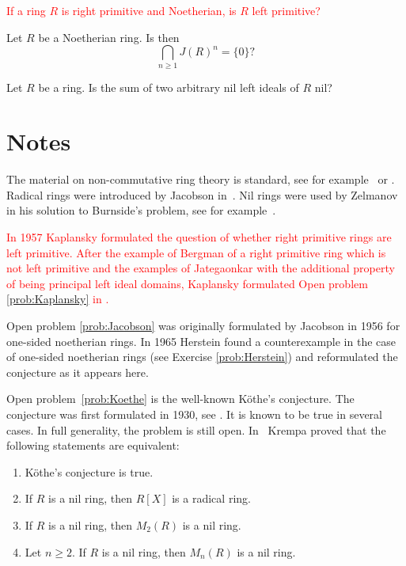 
\begin{problem}[Kaplansky]
\label{prob:Kaplansky}
\textcolor{red}{If a ring $R$ is right primitive and Noetherian, is $R$ left primitive?}
\end{problem}

\begin{problem}[Jacobson]
\label{prob:Jacobson}
Let $R$ be a Noetherian ring. Is then 
\[
\bigcap_{n\geq1}J(R)^n=\{0\}?
\]
\end{problem}

\begin{problem}[K\"othe]
	\label{prob:Koethe}
	Let $R$ be a ring. Is the sum 
	of two arbitrary nil left ideals of $R$  nil?
\end{problem}


\section{Notes}

The material on non-commutative ring theory is standard, see for example~\cite{MR3308118} or \cite{MR0530404}.
Radical rings were introduced by Jacobson in~\cite{MR12271}. Nil rings were
used by Zelmanov in his solution to Burnside's problem, see for example~\cite{MR1199575}.

\textcolor{red}{In 1957 \cite{MR0096696} Kaplansky formulated the question of whether right primitive rings are left primitive. After the example of Bergman of a right primitive ring which is not left primitive \cite{MR175940,MR167497} and the examples of Jategaonkar \cite{MR240131} with the additional property of being principal left ideal domains, Kaplansky formulated Open problem \ref{prob:Kaplansky} in  \cite{MR258865}. }

Open problem \ref{prob:Jacobson} was originally formulated by Jacobson in 1956 \cite{MR0222106} 
for one-sided noetherian rings. In 1965 Herstein \cite{MR188253} found a counterexample
in the case of one-sided noetherian rings (see Exercise \ref{prob:Herstein})
and reformulated the conjecture as it appears here. 

Open problem~\ref{prob:Koethe} is the well-known K\"othe's conjecture. 
The conjecture was first formulated in 1930, see \cite{MR1545158}. It is known to be true
in several cases. In full generality, the problem is still open. In~\cite{MR306251} 
Krempa proved that
the following statements are equivalent:
\begin{enumerate}
	\item K\"othe's conjecture is true.  
	\item If $R$ is a nil ring, then $R[X]$ is a radical ring. 
	\item If $R$ is a nil ring, then $M_2(R)$ is a nil ring. 
	\item Let $n\geq2$. If $R$ is a nil ring, then $M_n(R)$ is a nil ring. 
\end{enumerate}

